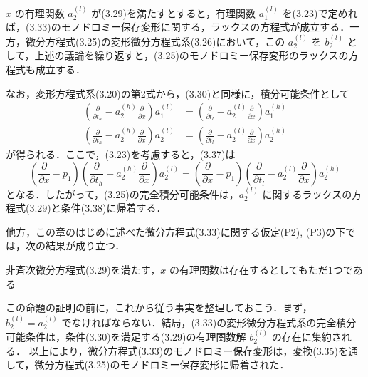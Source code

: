 \begin{story}
$x$ の有理関数 $a_2^{(l)}$ が(3.29)を満たすとすると，有理関数 $a_1^{(l)}$ を(3.23)で定めれば，(3.33)のモノドロミー保存変形に関する，ラックスの方程式が成立する．一方，微分方程式(3.25)の変形微分方程式系(3.26)において，この $a_2^{(l)}$ を $b_2^{(l)}$ として，上述の議論を繰り返すと，(3.25)のモノドロミー保存変形のラックスの方程式も成立する．

なお，変形方程式系(3.20)の第2式から，(3.30)と同様に，積分可能条件として
\begin{align}
    \left( \frac{\partial}{\partial t_h} - a_2^{(h)}\frac{\partial}{\partial x} \right) a_1^{(l)} &= \left( \frac{\partial}{\partial t_l} - a_2^{(l)}\frac{\partial}{\partial x} \right) a_1^{(h)} \label{eq:3.37} \\
    \left( \frac{\partial}{\partial t_h} - a_2^{(h)}\frac{\partial}{\partial x} \right) a_2^{(l)} &= \left( \frac{\partial}{\partial t_l} - a_2^{(l)}\frac{\partial}{\partial x} \right) a_2^{(h)} \label{eq:3.38}
\end{align}
が得られる．ここで，(3.23)を考慮すると，(3.37)は
\begin{equation*}
    \left( \frac{\partial}{\partial x} - p_1 \right)\left( \frac{\partial}{\partial t_h} - a_2^{(h)}\frac{\partial}{\partial x} \right) a_2^{(l)} = \left( \frac{\partial}{\partial x} - p_1 \right)\left( \frac{\partial}{\partial t_l} - a_2^{(l)}\frac{\partial}{\partial x} \right) a_2^{(h)}
\end{equation*}
となる．したがって，(3.25)の完全積分可能条件は，$a_2^{(l)}$ に関するラックスの方程式(3.29)と条件(3.38)に帰着する．

他方，この章のはじめに述べた微分方程式(3.33)に関する仮定(P2), (P3)の下では，次の結果が成り立つ．

\begin{proposition}[3.8]
非斉次微分方程式(3.29)を満たす，$x$ の有理関数は存在するとしてもただ1つである
\end{proposition}

この命題の証明の前に，これから従う事実を整理しておこう．まず，$b_2^{(l)} = a_2^{(l)}$ でなければならない．結局，(3.33)の変形微分方程式系の完全積分可能条件は，条件(3.30)を満足する(3.29)の有理関数解 $b_2^{(l)}$ の存在に集約される．
以上により，微分方程式(3.33)のモノドロミー保存変形は，変換(3.35)を通して，微分方程式(3.25)のモノドロミー保存変形に帰着された．


\end{story}
